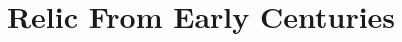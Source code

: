 \documentclass[11pt]{article}
\begin{document}
\ttfamily
\title{Relic From Early Centuries}
\maketitle
\end{document}
